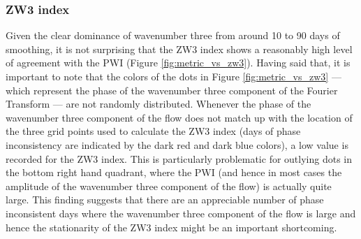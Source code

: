 \subsubsection{ZW3 index}

Given the clear dominance of wavenumber three from around 10 to 90 days of smoothing, it is not surprising that the ZW3 index \citep{Raphael2004} shows a reasonably high level of agreement with the PWI (Figure \ref{fig:metric_vs_zw3}). Having said that, it is important to note that the colors of the dots in Figure \ref{fig:metric_vs_zw3} --- which represent the phase of the wavenumber three component of the Fourier Transform --- are not randomly distributed. Whenever the phase of the wavenumber three component of the flow does not match up with the location of the three grid points used to calculate the ZW3 index (days of phase inconsistency are indicated by the dark red and dark blue colors), a low value is recorded for the ZW3 index. This is particularly problematic for outlying dots in the bottom right hand quadrant, where the PWI (and hence in most cases the amplitude of the wavenumber three component of the flow) is actually quite large. This finding suggests that there are an appreciable number of phase inconsistent days where the wavenumber three component of the flow is large and hence the stationarity of the ZW3 index might be an important shortcoming. 